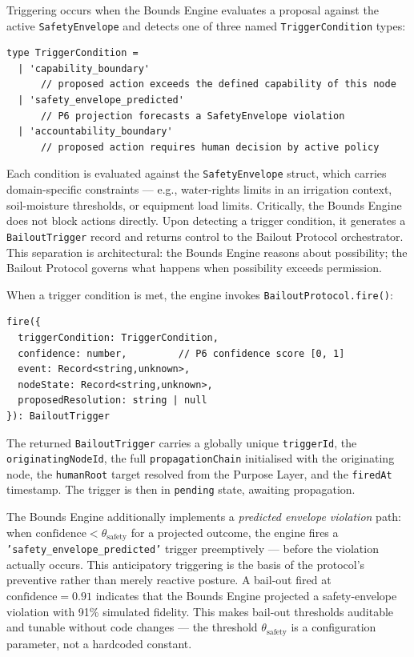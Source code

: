 Triggering occurs when the Bounds Engine evaluates a proposal against the active
\texttt{SafetyEnvelope} and detects one of three named \texttt{TriggerCondition}
types:

\begin{verbatim}
type TriggerCondition =
  | 'capability_boundary'
      // proposed action exceeds the defined capability of this node
  | 'safety_envelope_predicted'
      // P6 projection forecasts a SafetyEnvelope violation
  | 'accountability_boundary'
      // proposed action requires human decision by active policy
\end{verbatim}

Each condition is evaluated against the \texttt{SafetyEnvelope} struct, which carries
domain-specific constraints — e.g., water-rights limits in an irrigation context,
soil-moisture thresholds, or equipment load limits.  Critically, the Bounds Engine
does not block actions directly.  Upon detecting a trigger condition, it generates a
\texttt{BailoutTrigger} record and returns control to the Bailout Protocol
orchestrator.  This separation is architectural: the Bounds Engine reasons about
possibility; the Bailout Protocol governs what happens when possibility exceeds
permission.

When a trigger condition is met, the engine invokes \texttt{BailoutProtocol.fire()}:

\begin{verbatim}
fire({
  triggerCondition: TriggerCondition,
  confidence: number,         // P6 confidence score [0, 1]
  event: Record<string,unknown>,
  nodeState: Record<string,unknown>,
  proposedResolution: string | null
}): BailoutTrigger
\end{verbatim}

The returned \texttt{BailoutTrigger} carries a globally unique \texttt{triggerId},
the \texttt{originatingNodeId}, the full \texttt{propagationChain} initialised with
the originating node, the \texttt{humanRoot} target resolved from the Purpose Layer,
and the \texttt{firedAt} timestamp.  The trigger is then in \texttt{pending} state,
awaiting propagation.

The Bounds Engine additionally implements a \emph{predicted envelope violation} path:
when $\text{confidence} < \theta_{\text{safety}}$ for a projected outcome, the
engine fires a \texttt{'safety\_envelope\_predicted'} trigger preemptively — before
the violation actually occurs.  This anticipatory triggering is the basis of the
protocol's preventive rather than merely reactive posture.  A bail-out fired at
$\text{confidence} = 0.91$ indicates that the Bounds Engine projected a safety-envelope
violation with 91\% simulated fidelity.  This makes bail-out thresholds auditable
and tunable without code changes — the threshold $\theta_{\text{safety}}$ is a
configuration parameter, not a hardcoded constant.

